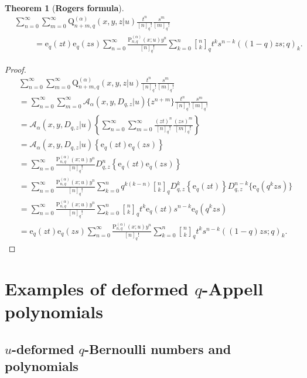\documentclass[12pt]{article}
\newcommand{\qbinom}{\genfrac{[}{]}{0pt}{}}
\newcommand{\e}{\mathrm{e}}
\newcommand{\p}{\mathrm{P}}
\newcommand{\q}{\mathrm{Q}}
\newcommand{\Aa}{\mathscr{A}}
\newtheorem{theorem}{Theorem}
\begin{document}
\begin{theorem}[{\bf Rogers formula}]
    \begin{align}
        &\sum_{n=0}^{\infty}\sum_{m=0}^{\infty}\q_{n+m,q}^{(\alpha)}(x,y,z|u)\frac{t^{n}}{[n]_{q}!}\frac{s^{m}}{[m]_{q}!}\nonumber\\
        &\hspace{1cm}=\e_{q}(zt)\e_{q}(zs)\sum_{n=0}^{\infty}\frac{\p_{n,q}^{(\alpha)}(x;u)y^n}{[n]_{q}!}\sum_{k=0}^{n}\qbinom{n}{k}_{q}t^{k}s^{n-k}((1-q)zs;q)_{k}.
    \end{align}
\end{theorem}
\begin{proof}
    \begin{align*}
        &\sum_{n=0}^{\infty}\sum_{m=0}^{\infty}\q_{n+m,q}^{(\alpha)}(x,y,z|u)\frac{t^{n}}{[n]_{q}!}\frac{s^{m}}{[m]_{q}!}\\
        &=\sum_{n=0}^{\infty}\sum_{m=0}^{\infty}\Aa_{\alpha}(x,y,D_{q,z}|u)\{z^{n+m}\}\frac{t^{n}}{[n]_{q}!}\frac{s^{m}}{[m]_{q}!}\\
        &=\Aa_{\alpha}(x,y,D_{q,z}|u)\left\{\sum_{n=0}^{\infty}\sum_{m=0}^{\infty}\frac{(zt)^{n}}{[n]_{q}!}\frac{(zs)^{m}}{[m]_{q}!}\right\}\\
        &=\Aa_{\alpha}(x,y,D_{q,z}|u)\left\{\e_{q}(zt)\e_{q}(zs)\right\}\\
        &=\sum_{n=0}^{\infty}\frac{\p_{n,q}^{(\alpha)}(x;u)y^n}{[n]_{q}!}D_{q,z}^{n}\left\{\e_{q}(zt)\e_{q}(zs)\right\}\\
        &=\sum_{n=0}^{\infty}\frac{\p_{n,q}^{(\alpha)}(x;u)y^n}{[n]_{q}!}\sum_{k=0}^{n}q^{k(k-n)}\qbinom{n}{k}_{q}D_{q,z}^{k}\left\{\e_{q}(zt)\right\}D_{q,z}^{n-k}\{\e_{q}(q^kzs)\}\\
        &=\sum_{n=0}^{\infty}\frac{\p_{n,q}^{(\alpha)}(x;u)y^n}{[n]_{q}!}\sum_{k=0}^{n}\qbinom{n}{k}_{q}t^{k}\e_{q}(zt)s^{n-k}\e_{q}(q^kzs)\\
        &=\e_{q}(zt)\e_{q}(zs)\sum_{n=0}^{\infty}\frac{\p_{n,q}^{(\alpha)}(x;u)y^n}{[n]_{q}!}\sum_{k=0}^{n}\qbinom{n}{k}_{q}t^{k}s^{n-k}((1-q)zs;q)_{k}.
    \end{align*}
\end{proof}





\section{Examples of deformed $q$-Appell polynomials}

\subsection{$u$-deformed $q$-Bernoulli numbers and polynomials}
\end{document}
